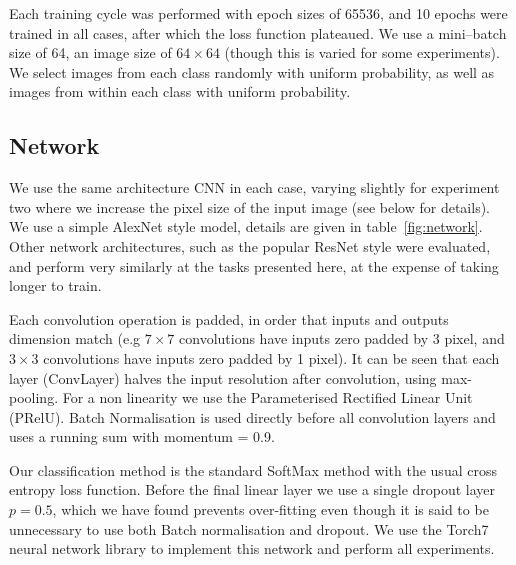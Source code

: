 \documentclass[conference]{IEEEtran}
\begin{document}
Each training cycle was performed with epoch sizes of 65536, and 10 epochs were trained in all cases, after which the loss function plateaued. We use a mini--batch size of 64, an image size of $64\times64$ (though this is varied for some experiments). We select images from each class randomly with uniform probability, as well as images from within each class with uniform probability.

\subsection {Network}

We use the same architecture CNN in each case, varying slightly for experiment two where we increase the pixel size of the input image (see below for details). We use a simple AlexNet \cite {Krizhevsky2012} style model, details are given in table~\ref{fig:network}. Other network architectures, such as the popular ResNet \cite{He2015} style were evaluated, and perform very similarly at the tasks presented here, at the expense of taking longer to train.

Each convolution operation is padded, in order that inputs and outputs dimension match (e.g $ 7\times7 $ convolutions have inputs zero padded by 3 pixel, and $3\times3$ convolutions have inputs zero padded by 1 pixel). It can be seen that each layer (ConvLayer) halves the input resolution after convolution, using max-pooling. For a non linearity we use the Parameterised Rectified Linear Unit (PRelU). Batch Normalisation is used directly before all convolution layers and uses a running sum with momentum = 0.9.

Our classification method is the standard SoftMax method with the usual cross entropy loss function. Before the final linear layer we use a single dropout layer $ p = 0.5 $, which we have found prevents over-fitting even though it is said to be unnecessary to use both Batch normalisation and dropout.  We use the Torch7 \cite{Collobert2011} neural network library to implement this network and perform all experiments. 
\end{document}
